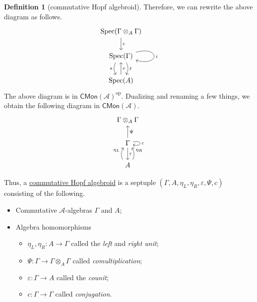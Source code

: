 \documentclass[a4paper,10pt]{scrreprt}
\newcommand{\defn}[1]{\ul{#1}}
\newcommand{\Spec}{\mathrm{Spec}}
\theoremstyle{definition}
\newtheorem{definition}{Definition}[section]
\theoremstyle{plain}
\theoremstyle{remark}
\begin{document}
\begin{definition}[commutative Hopf algebroid]
  Therefore, we can rewrite the above diagram as follows.
  \begin{equation*}
    \begin{tikzcd}
      \Spec(\Gamma \otimes_{A} \Gamma)
      \arrow[d, "c"]
      \\
      \Spec(\Gamma)
      \arrow[d, shift left, bend left, "t"]
      \arrow[d, shift right, bend right, swap, "s"]
      \arrow[loop right, "i"]
      \\
      \Spec(A)
      \arrow[u, swap, "e"]
    \end{tikzcd}
  \end{equation*}
  The above diagram is in $\mathsf{CMon}(\mathscr{A})^{\mathrm{op}}$. Dualizing and renaming a few things, we obtain the following diagram in $\mathsf{CMon}(\mathscr{A})$.
  \begin{equation*}
    \begin{tikzcd}
      \Gamma \otimes_{A} \Gamma
      \\
      \Gamma
      \arrow[u, swap, "\Psi"]
      \arrow[d, "\varepsilon"]
      \arrow[loop right, "c"]
      \\
      A
      \arrow[u, shift left, bend left, "\eta_{L}"]
      \arrow[u, shift right, bend right, swap, "\eta_{R}"]
    \end{tikzcd}
  \end{equation*}

  Thus, a \defn{commutative Hopf algebroid} is a septuple $(\Gamma, A, \eta_{L}, \eta_{R}, \varepsilon, \Psi, c)$ consisting of the following.
  \begin{itemize}
    \item Commutative $\mathscr{A}$-algebras $\Gamma$ and $A$;

    \item Algebra homomorphisms
      \begin{itemize}
        \item $\eta_{L},\eta_{R}\colon A \to \Gamma$ called the \emph{left} and \emph{right unit};

        \item $\Psi\colon \Gamma \to \Gamma \otimes_{A} \Gamma$ called \emph{comultiplication};

        \item $\varepsilon\colon \Gamma \to A$ called the \emph{counit};

        \item $c\colon \Gamma \to \Gamma$ called \emph{conjugation}.
      \end{itemize}
  \end{itemize}


\end{definition}
\end{document}
